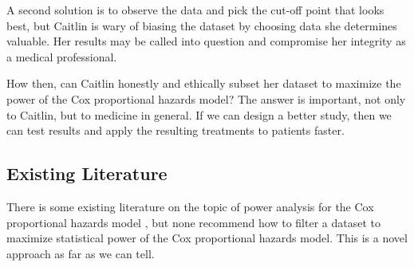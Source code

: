 A second solution is to observe the data and pick the cut-off point that looks best, but Caitlin is wary of biasing the dataset by choosing data she determines valuable. Her results may be called into question and compromise her integrity as a medical professional. 

How then, can Caitlin honestly and ethically subset her dataset to maximize the power of the Cox proportional hazards model? The answer is important, not only to Caitlin, but to medicine in general. If we can design a better study, then we can test results and apply the resulting treatments to patients faster. 

\subsection{Existing Literature}

There is some existing literature on the topic of power analysis for the Cox proportional hazards model \cite{bender, gonen, hsieh}, but none recommend how to filter a dataset to maximize statistical power of the Cox proportional hazards model. This is a novel approach as far as we can tell.
